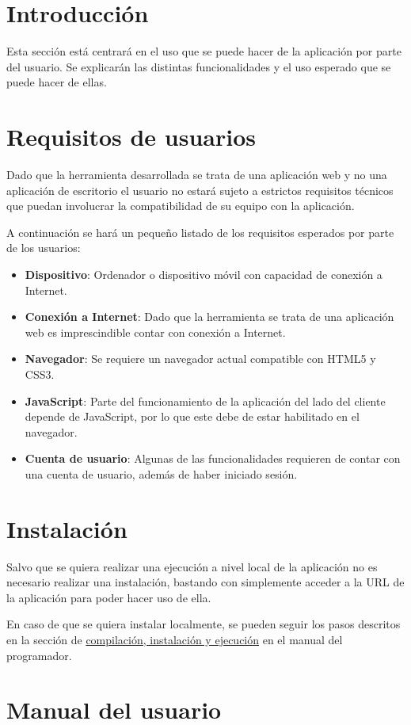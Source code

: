 
\section{Introducción}
Esta sección está centrará en el uso que se puede hacer de la aplicación por parte del usuario. Se explicarán las distintas funcionalidades y el uso esperado que se puede hacer de ellas.
\section{Requisitos de usuarios}
Dado que la herramienta desarrollada se trata de una aplicación web y no una aplicación de escritorio el usuario no estará sujeto a estrictos requisitos técnicos que puedan involucrar la compatibilidad de su equipo con la aplicación.

 A continuación se hará un pequeño listado de los requisitos esperados por parte de los usuarios:
 
 \begin{itemize}
 	\item \textbf{Dispositivo}: Ordenador o dispositivo móvil con capacidad de conexión a Internet.
 	\item \textbf{Conexión a Internet}: Dado que la herramienta se trata de una aplicación web es imprescindible contar con conexión a Internet.
 	\item \textbf{Navegador}: Se requiere un navegador actual compatible con HTML5 y CSS3.
 	\item \textbf{JavaScript}: Parte del funcionamiento de la aplicación del lado del cliente depende de JavaScript, por lo que este debe de estar habilitado en el navegador.
 	\item \textbf{Cuenta de usuario}: Algunas de las funcionalidades requieren de contar con una cuenta de usuario, además de haber iniciado sesión.
 \end{itemize}


\section{Instalación}

Salvo que se quiera realizar una ejecución a nivel local de la aplicación no es necesario realizar una instalación, bastando con simplemente acceder a la URL de la aplicación para poder hacer uso de ella.

En caso de que se quiera instalar localmente, se pueden seguir los pasos descritos en la sección de \hyperref[sec:compilación]{compilación, instalación y ejecución} en el manual del programador.
\section{Manual del usuario}



